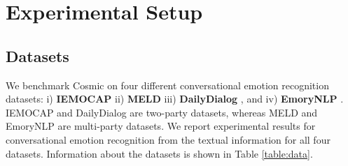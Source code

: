 \documentclass[11pt,a4paper]{article}
\begin{document}
\section{Experimental Setup}
\label{sec:exp}
\subsection{Datasets}
\begin{table}[ht!]
\centering
{}
    \caption{Statistics of splits
and evaluation metrics used in different datasets.
In MELD and EmoryNLP evaluation is performed for 3 class (broad) and 7 class (fine-grained) classification. \textit{Neutral}* classes constitutes to 83\% of the DailyDialog dataset. These are excluded when calculating the Micro F1 score.}
    \label{table:data}
\end{table}

We benchmark {\sc Cosmic} on four different conversational emotion recognition datasets: i) \textbf{IEMOCAP} \cite{iemocap} ii) \textbf{MELD} \cite{poria2018meld} iii) \textbf{DailyDialog} \cite{li2017dailydialog}, and iv) \textbf{EmoryNLP} \cite{zahiri2018emotion}. IEMOCAP and DailyDialog are two-party datasets, whereas MELD and EmoryNLP are multi-party datasets.
We report experimental results for conversational emotion recognition from the textual information for all four datasets.
Information about the datasets is shown in Table \ref{table:data}.
\end{document}
